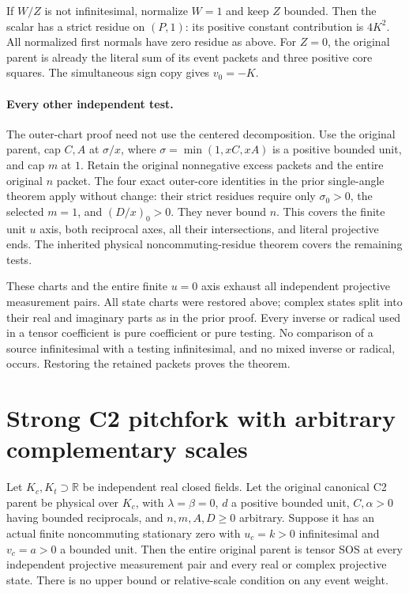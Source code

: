 If $W/Z$ is not infinitesimal, normalize $W=1$ and keep $Z$
bounded.  Then the scalar has a strict residue on $(P,1)$:
its positive constant contribution is $4K^2$.  All normalized
first normals have zero residue as above.  For $Z=0$, the original
parent is already the literal sum of its event packets and three
positive core squares.  The simultaneous sign copy gives $v_0=-K$.

\paragraph{Every other independent test.}
The outer-chart proof need not use the centered decomposition.
Use the original parent, cap $C,A$ at $\sigma/x$, where
$\sigma=\min(1,xC,xA)$ is a positive bounded unit, and cap $m$ at
$1$.  Retain the original nonnegative excess packets and the
entire original $n$ packet.  The four exact outer-core identities
in the prior single-angle theorem apply without change: their
strict residues require only $\sigma_0>0$, the selected $m=1$,
and $(D/x)_0>0$.  They never bound $n$.  This covers the finite
unit $u$ axis, both reciprocal axes, all their intersections, and
literal projective ends.  The inherited physical
noncommuting-residue theorem covers the remaining tests.

These charts and the entire finite $u=0$ axis exhaust all independent
projective measurement pairs.  All state charts were restored above;
complex states split into their real and imaginary parts as in the
prior proof.  Every inverse or radical used in a tensor coefficient
is pure coefficient or pure testing.  No comparison of a source
infinitesimal with a testing infinitesimal, and no mixed inverse
or radical, occurs.  Restoring the retained packets proves the theorem.


\section{\texorpdfstring{Strong C2 pitchfork with arbitrary complementary scales}{Strong C2 pitchfork with arbitrary complementary scales}}
\label{component:pf7943b34a7dc}

\label{pf7943b34a7dc:sec:strong-complement-pitchfork}

\begin{theorem}
\label{pf7943b34a7dc:thm:strong-complement-pitchfork}
Let $K_c,K_t\supset\mathbb R$ be independent real closed fields.
Let the original canonical C2 parent be physical over $K_c$, with
$\lambda=\beta=0$, $d$ a positive bounded unit, $C,\alpha>0$
having bounded reciprocals, and $n,m,A,D\geq0$ arbitrary.
Suppose it has an actual finite noncommuting stationary zero with
$u_c=k>0$ infinitesimal and $v_c=a>0$ a bounded unit.
Then the entire original parent is tensor SOS at every independent
projective measurement pair and every real or complex projective state.
There is no upper bound or relative-scale condition on any event weight.
\end{theorem}

